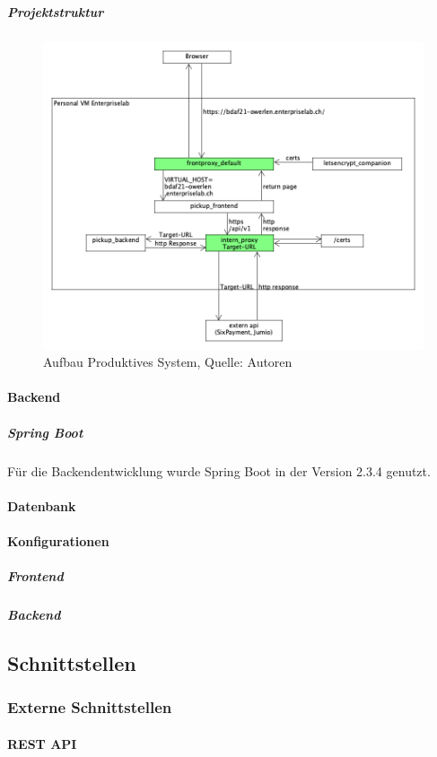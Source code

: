 \subparagraph{Projektstruktur}
\begin{figure}[H]
	\centering
	\includegraphics[width=1\textwidth]{images/requestHandling.png}
	\caption[Aufbau Produktives System]{Aufbau Produktives System, Quelle: Autoren}
	\label{img: prodSystem}
\end{figure}
\paragraph{Backend}
\subparagraph{Spring Boot}
Für die Backendentwicklung wurde Spring Boot in der Version 2.3.4 genutzt.
\paragraph{Datenbank}
\paragraph{Konfigurationen}
\subparagraph{Frontend}

\newpage
\subparagraph{Backend}
\newpage
\subsection{Schnittstellen}

\subsubsection{Externe Schnittstellen}
\paragraph{REST API}

